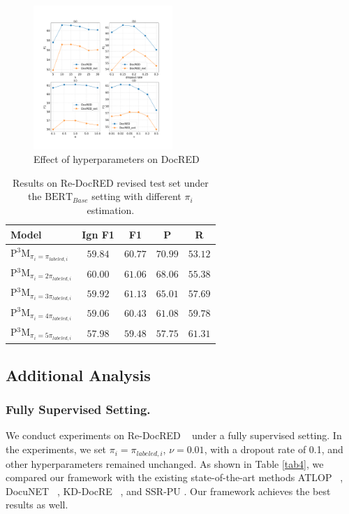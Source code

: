 \documentclass[letterpaper]{article}
\begin{document}
\begin{figure}
\centering
\includegraphics[width=0.47\textwidth]{hyperparameters.pdf}
\caption{Effect of hyperparameters on DocRED}
\label{fig2}
\end{figure}

\begin{table}
\centering
\begin{tabular}{lcccc}
\toprule \textbf{Model} & Ign F1 & F1 & P & R \\
\midrule
P$^{3}$M$_{\pi_{i}=\pi_{labeled,i}}$& $59.84$ & $60.77$ & $70.99$ & $53.12$ \\
P$^{3}$M$_{\pi_{i}=2\pi_{labeled,i}}$ & $60.00$ & $61.06$ & $68.06$ & $55.38$ \\
P$^{3}$M$_{\pi_{i}=3\pi_{labeled,i}}$ & $59.92$ & $61.13$ & $65.01$ & $57.69$ \\
P$^{3}$M$_{\pi_{i}=4\pi_{labeled,i}}$ & $59.06$ & $60.43$ & $61.08$ & $59.78$ \\
P$^{3}$M$_{\pi_{i}=5\pi_{labeled,i}}$ & $57.98$ & $59.48$ & $57.75$ & $61.31$ \\
\bottomrule
\end{tabular}
\caption{
Results on Re-DocRED revised test set under the $\mathrm{BERT}_{Base}$ setting with different $\pi_{i}$ estimation.
}
\label{tab5}
\end{table}

\subsection{Additional Analysis}

\subsubsection{Fully Supervised Setting.}
We conduct experiments on Re-DocRED ~\cite{DBLP:conf/emnlp/Tan0BNA22} under a fully supervised setting. In the experiments, we set $\pi_{i}=\pi_{labeled,i}$, $\nu=0.01$, with a dropout rate of 0.1, and other hyperparameters remained unchanged. As shown in Table \ref{tab4}, we compared our framework with the existing state-of-the-art methods ATLOP ~\cite{DBLP:conf/aaai/Zhou0M021}, DocuNET ~\cite{DBLP:conf/ijcai/ZhangCXDTCHSC21}, KD-DocRE ~\cite{DBLP:conf/acl/TanHBN22}, and SSR-PU \cite{DBLP:conf/emnlp/WangLHZ22}. Our framework achieves the best results as well.
\end{document}
